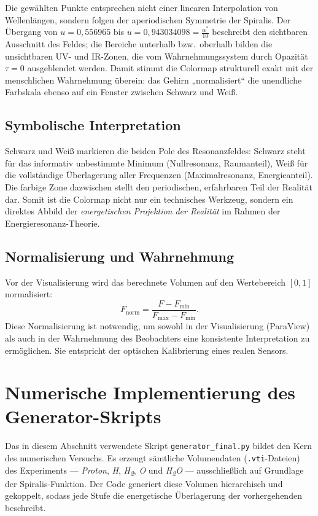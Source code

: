 Die gewählten Punkte entsprechen nicht einer linearen Interpolation 
von Wellenlängen, sondern folgen der aperiodischen Symmetrie der Spiralis.  
Der Übergang von $u=0{,}556965$ bis $u=0{,}943034098=\frac{\alpha^*}{10}$
beschreibt den sichtbaren Ausschnitt des Feldes; 
die Bereiche unterhalb bzw.\ oberhalb bilden 
die unsichtbaren UV- und IR-Zonen, die vom Wahrnehmungssystem 
durch Opazität $\tau=0$ ausgeblendet werden.  
Damit stimmt die Colormap strukturell exakt mit der menschlichen Wahrnehmung überein:
das Gehirn „normalisiert“ die unendliche Farbskala ebenso auf ein Fenster
zwischen Schwarz und Weiß.

\subsection{Symbolische Interpretation}

Schwarz und Weiß markieren die beiden Pole des Resonanzfeldes:
Schwarz steht für das informativ unbestimmte Minimum 
(Nullresonanz, Raumanteil), 
Weiß für die vollständige Überlagerung aller Frequenzen 
(Maximalresonanz, Energieanteil).  
Die farbige Zone dazwischen stellt den periodischen, 
erfahrbaren Teil der Realität dar.  
Somit ist die Colormap nicht nur ein technisches Werkzeug, 
sondern ein direktes Abbild der 
\emph{energetischen Projektion der Realität} 
im Rahmen der Energieresonanz-Theorie.



\subsection{Normalisierung und Wahrnehmung}

Vor der Visualisierung wird das berechnete Volumen auf den Wertebereich $[0,1]$
normalisiert:
\[
F_\text{norm} = \frac{F - F_\text{min}}{F_\text{max} - F_\text{min}}.
\]
Diese Normalisierung ist notwendig, um sowohl in der Visualisierung
(ParaView) als auch in der Wahrnehmung des Beobachters
eine konsistente Interpretation zu ermöglichen.
Sie entspricht der optischen Kalibrierung eines realen Sensors.

\section{Numerische Implementierung des Generator-Skripts}

Das in diesem Abschnitt verwendete Skript \texttt{generator\_final.py} bildet den Kern des numerischen Versuchs. Es erzeugt sämtliche Volumendaten (\texttt{.vti}-Dateien) des Experiments — \textit{Proton}, \textit{H}, \textit{H\textsubscript{2}}, \textit{O} und \textit{H\textsubscript{2}O} — ausschließlich auf Grundlage der Spiralis-Funktion. Der Code generiert diese Volumen hierarchisch und gekoppelt, sodass jede Stufe die energetische Überlagerung der vorhergehenden beschreibt.

